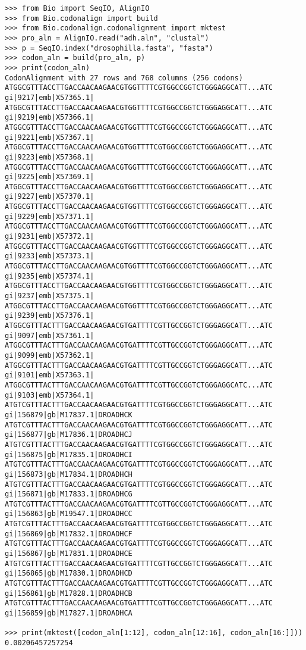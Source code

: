 \documentclass{article}
\begin{document}
\begin{verbatim}
>>> from Bio import SeqIO, AlignIO
>>> from Bio.codonalign import build
>>> from Bio.codonalign.codonalignment import mktest
>>> pro_aln = AlignIO.read("adh.aln", "clustal")
>>> p = SeqIO.index("drosophilla.fasta", "fasta")
>>> codon_aln = build(pro_aln, p)
>>> print(codon_aln)
CodonAlignment with 27 rows and 768 columns (256 codons)
ATGGCGTTTACCTTGACCAACAAGAACGTGGTTTTCGTGGCCGGTCTGGGAGGCATT...ATC gi|9217|emb|X57365.1|
ATGGCGTTTACCTTGACCAACAAGAACGTGGTTTTCGTGGCCGGTCTGGGAGGCATT...ATC gi|9219|emb|X57366.1|
ATGGCGTTTACCTTGACCAACAAGAACGTGGTTTTCGTGGCCGGTCTGGGAGGCATT...ATC gi|9221|emb|X57367.1|
ATGGCGTTTACCTTGACCAACAAGAACGTGGTTTTCGTGGCCGGTCTGGGAGGCATT...ATC gi|9223|emb|X57368.1|
ATGGCGTTTACCTTGACCAACAAGAACGTGGTTTTCGTGGCCGGTCTGGGAGGCATT...ATC gi|9225|emb|X57369.1|
ATGGCGTTTACCTTGACCAACAAGAACGTGGTTTTCGTGGCCGGTCTGGGAGGCATT...ATC gi|9227|emb|X57370.1|
ATGGCGTTTACCTTGACCAACAAGAACGTGGTTTTCGTGGCCGGTCTGGGAGGCATT...ATC gi|9229|emb|X57371.1|
ATGGCGTTTACCTTGACCAACAAGAACGTGGTTTTCGTGGCCGGTCTGGGAGGCATT...ATC gi|9231|emb|X57372.1|
ATGGCGTTTACCTTGACCAACAAGAACGTGGTTTTCGTGGCCGGTCTGGGAGGCATT...ATC gi|9233|emb|X57373.1|
ATGGCGTTTACCTTGACCAACAAGAACGTGGTTTTCGTGGCCGGTCTGGGAGGCATT...ATC gi|9235|emb|X57374.1|
ATGGCGTTTACCTTGACCAACAAGAACGTGGTTTTCGTGGCCGGTCTGGGAGGCATT...ATC gi|9237|emb|X57375.1|
ATGGCGTTTACCTTGACCAACAAGAACGTGGTTTTCGTGGCCGGTCTGGGAGGCATT...ATC gi|9239|emb|X57376.1|
ATGGCGTTTACTTTGACCAACAAGAACGTGATTTTCGTTGCCGGTCTGGGAGGCATT...ATC gi|9097|emb|X57361.1|
ATGGCGTTTACTTTGACCAACAAGAACGTGATTTTCGTTGCCGGTCTGGGAGGCATT...ATC gi|9099|emb|X57362.1|
ATGGCGTTTACTTTGACCAACAAGAACGTGATTTTCGTTGCCGGTCTGGGAGGCATT...ATC gi|9101|emb|X57363.1|
ATGGCGTTTACTTTGACCAACAAGAACGTGATTTTCGTTGCCGGTCTGGGAGGCATC...ATC gi|9103|emb|X57364.1|
ATGTCGTTTACTTTGACCAACAAGAACGTGATTTTCGTGGCCGGTCTGGGAGGCATT...ATC gi|156879|gb|M17837.1|DROADHCK
ATGTCGTTTACTTTGACCAACAAGAACGTGATTTTCGTGGCCGGTCTGGGAGGCATT...ATC gi|156877|gb|M17836.1|DROADHCJ
ATGTCGTTTACTTTGACCAACAAGAACGTGATTTTCGTGGCCGGTCTGGGAGGCATT...ATC gi|156875|gb|M17835.1|DROADHCI
ATGTCGTTTACTTTGACCAACAAGAACGTGATTTTCGTGGCCGGTCTGGGAGGCATT...ATC gi|156873|gb|M17834.1|DROADHCH
ATGTCGTTTACTTTGACCAACAAGAACGTGATTTTCGTGGCCGGTCTGGGAGGCATT...ATC gi|156871|gb|M17833.1|DROADHCG
ATGTCGTTTACTTTGACCAACAAGAACGTGATTTTCGTTGCCGGTCTGGGAGGCATT...ATC gi|156863|gb|M19547.1|DROADHCC
ATGTCGTTTACTTTGACCAACAAGAACGTGATTTTCGTGGCCGGTCTGGGAGGCATT...ATC gi|156869|gb|M17832.1|DROADHCF
ATGTCGTTTACTTTGACCAACAAGAACGTGATTTTCGTGGCCGGTCTGGGAGGCATT...ATC gi|156867|gb|M17831.1|DROADHCE
ATGTCGTTTACTTTGACCAACAAGAACGTGATTTTCGTTGCCGGTCTGGGAGGCATT...ATC gi|156865|gb|M17830.1|DROADHCD
ATGTCGTTTACTTTGACCAACAAGAACGTGATTTTCGTTGCCGGTCTGGGAGGCATT...ATC gi|156861|gb|M17828.1|DROADHCB
ATGTCGTTTACTTTGACCAACAAGAACGTGATTTTCGTTGCCGGTCTGGGAGGCATT...ATC gi|156859|gb|M17827.1|DROADHCA

>>> print(mktest([codon_aln[1:12], codon_aln[12:16], codon_aln[16:]]))
0.00206457257254
\end{verbatim}
\end{document}
